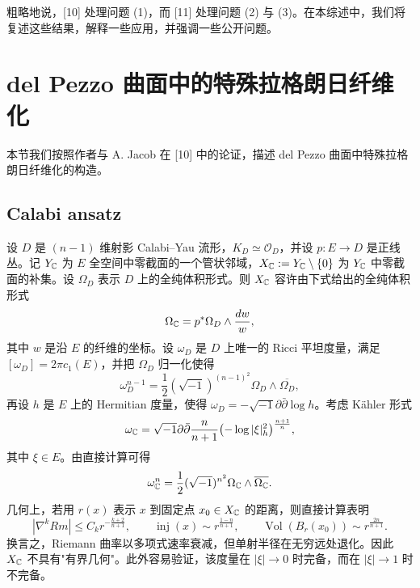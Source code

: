 粗略地说，[10] 处理问题 (1)，而 [11] 处理问题 (2) 与 (3)。在本综述中，我们将复述这些结果，解释一些应用，并强调一些公开问题。

\section{del Pezzo 曲面中的特殊拉格朗日纤维化}
本节我们按照作者与 A. Jacob 在 [10] 中的论证，描述 del Pezzo 曲面中特殊拉格朗日纤维化的构造。

\subsection{Calabi ansatz}
设 $D$ 是 $(n-1)$ 维射影 Calabi--Yau 流形，$K_D\simeq\mathcal{O}_D$，并设 $p:E\to D$ 是正线丛。记 $Y_{\mathbb{C}}$ 为 $E$ 全空间中零截面的一个管状邻域，$X_{\mathbb{C}}:=Y_{\mathbb{C}}\setminus\{0\}$ 为 $Y_{\mathbb{C}}$ 中零截面的补集。设 $\Omega_D$ 表示 $D$ 上的全纯体积形式。则 $X_{\mathbb{C}}$ 容许由下式给出的全纯体积形式
\[
\Omega_{\mathbb{C}}=p^*\Omega_D\wedge\frac{dw}{w},
\]
其中 $w$ 是沿 $E$ 的纤维的坐标。设 $\omega_D$ 是 $D$ 上唯一的 Ricci 平坦度量，满足 $[\omega_D]=2\pi c_1(E)$，并把 $\Omega_D$ 归一化使得
\[
\omega_D^{n-1}=\frac{1}{2}(\sqrt{-1})^{(n-1)^2}\Omega_D\wedge\overline{\Omega_D},
\]
再设 $h$ 是 $E$ 上的 Hermitian 度量，使得 $\omega_D=-\sqrt{-1}\partial\bar\partial\log h$。考虑 Kähler 形式
\[
\omega_{\mathbb{C}}=\sqrt{-1}\partial\bar\partial\frac{n}{n+1}\bigl(-\log|\xi|_h^2\bigr)^{\frac{n+1}{n}},
\]
其中 $\xi\in E$。由直接计算可得
\[
\omega_{\mathbb{C}}^n=\frac{1}{2}(\sqrt{-1})^{n^2}\Omega_{\mathbb{C}}\wedge\overline{\Omega_{\mathbb{C}}}.
\]
几何上，若用 $r(x)$ 表示 $x$ 到固定点 $x_0\in X_{\mathbb{C}}$ 的距离，则直接计算表明
\begin{equation}
|\nabla^k Rm|\le C_k r^{-\frac{k+2}{n+1}},\qquad \operatorname{inj}(x)\sim r^{\frac{1-n}{n+1}},\qquad \operatorname{Vol}(B_r(x_0))\sim r^{\frac{2n}{n+1}}.
\tag{6.2.1}
\end{equation}
换言之，Riemann 曲率以多项式速率衰减，但单射半径在无穷远处退化。因此 $X_{\mathbb{C}}$ 不具有"有界几何"。此外容易验证，该度量在 $|\xi|\to 0$ 时完备，而在 $|\xi|\to 1$ 时不完备。

